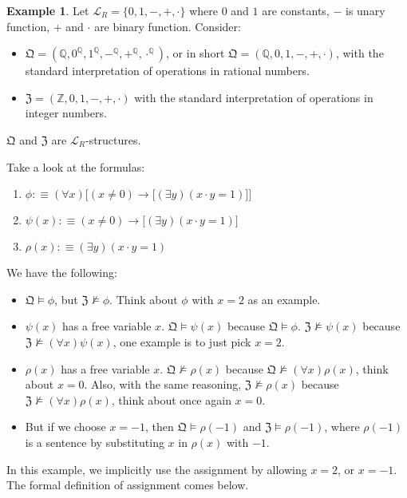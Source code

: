 \documentclass[11pt,letterpaper]{book}
\theoremstyle{definition}
\newtheorem{example}{Example}[section]
\begin{document}
\begin{example}
Let $\mathcal{L}_R = \{ 0,1,-,+,\cdot \}$ where $0$ and $1$ are
constants, $-$ is unary function, $+$ and $\cdot$ are binary function.
Consider:
\begin{itemize}
\item{$\mathfrak{Q}= (\mathbb{Q}, 0^{\mathbb{Q}}, 1^{\mathbb{Q}},
-^{\mathbb{Q}}, +^{\mathbb{Q}}, \cdot^{\mathbb{Q}})$, or in short $
\mathfrak{Q} = (\mathbb{Q}, 0, 1,
-, + , \cdot)$, with the standard interpretation of operations in
rational numbers. }
\item{$\mathfrak{Z} = (\mathbb{Z},0, 1, -, + , \cdot )$ with the standard
interpretation of operations in integer numbers.}
\end{itemize}

$\mathfrak{Q}$ and $\mathfrak{Z}$ are $\mathcal{L}_R$-structures.

Take a look at the formulas:
\begin{enumerate}
\item{$\phi :\equiv (\forall x ) \Big[ (x \neq 0) \rightarrow
\Big[(\exists y) (x\cdot y = 1) \Big]  \Big]$}
\item{$\psi (x) :\equiv (x \neq 0) \rightarrow \Big[(\exists y) (x\cdot
y = 1) \Big] $}
\item{$\rho (x) :\equiv (\exists y) (x\cdot y = 1)$}
\end{enumerate}

We have the following:
\begin{itemize}
\item{$\mathfrak{Q} \models \phi$, but $\mathfrak{Z} \not \models \phi$.
Think about $\phi$ with $x=2$ as an example.}
\item{$\psi(x)$ has a free variable $x$. $\mathfrak{Q} \models \psi(x)$
because $\mathfrak{Q} \models \phi$. $\mathfrak{Z} \not \models \psi(x)$
because $\mathfrak{Z} \not \models (\forall x) \psi(x)$, one example is
to just pick $x = 2$.}
\item{$\rho(x)$ has a free variable $x$. $\mathfrak{Q} \not \models
\rho(x)$ because $\mathfrak{Q} \not \models (\forall x) \rho(x)$, think
about $x=0$. Also, with the same reasoning, $\mathfrak{Z} \not \models
\rho(x)$ because $\mathfrak{Z} \not \models (\forall x) \rho(x)$, think
about once again $x=0$.}
\item{But if we choose $x=-1$, then $\mathfrak{Q} \models \rho(-1)$ and
$\mathfrak{Z} \models \rho (-1)$, where $\rho(-1)$ is a sentence by
substituting $x$ in $\rho(x)$ with $-1$.}

\end{itemize}

In this example, we implicitly use the assignment by allowing $x=2$, or
$x=-1$. The formal definition of assignment comes below.

\end{example}
\end{document}
